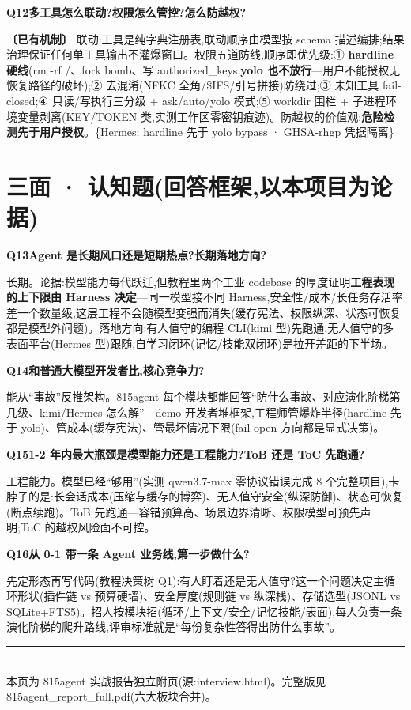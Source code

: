 \documentclass[10pt,a4paper]{article}
\renewcommand{\small}{\fontsize{8}{11.5}\selectfont}
\renewcommand{\footnotesize}{\fontsize{7.5}{10.5}\selectfont}
\newcommand{\taghave}{\textcolor{okc}{\textbf{〔已有机制〕}}}
\newcommand{\tagref}[1]{\textcolor{dimc}{\footnotesize\{#1\}}}
\newcommand{\qhead}[2]{\par\vspace{7pt}\noindent
  \colorbox{acc}{\color{white}\bfseries\small #1}\hspace{4pt}\textbf{#2}\par\vspace{2pt}}
\newenvironment{qa}[2]{\qhead{#1}{#2}\small}{\par\vspace{2pt}}
\begin{document}
\begin{qa}{Q12}{多工具怎么联动?权限怎么管控?怎么防越权?}
\taghave{} 联动:工具是纯字典注册表,联动顺序由模型按 schema 描述编排;结果治理保证任何单工具输出不灌爆窗口。权限五道防线,顺序即优先级:① \textbf{hardline 硬线}(rm -rf /、fork bomb、写 authorized\_keys,\textbf{yolo 也不放行}---用户不能授权无恢复路径的破坏);② 去混淆(NFKC 全角/\$IFS/引号拼接)防绕过;③ 未知工具 fail-closed;④ 只读/写执行三分级 + ask/auto/yolo 模式;⑤ workdir 围栏 + 子进程环境变量剥离(KEY/TOKEN 类,实测工作区零密钥痕迹)。防越权的价值观:\textbf{危险检测先于用户授权}。\tagref{Hermes: hardline 先于 yolo bypass · GHSA-rhgp 凭据隔离}
\end{qa}

\section{三面 · 认知题(回答框架,以本项目为论据)}

\begin{qa}{Q13}{Agent 是长期风口还是短期热点?长期落地方向?}
长期。论据:模型能力每代跃迁,但教程里两个工业 codebase 的厚度证明\textbf{工程表现的上下限由 Harness 决定}---同一模型接不同 Harness,安全性/成本/长任务存活率差一个数量级,这层工程不会随模型变强而消失(缓存宪法、权限纵深、状态可恢复都是模型外问题)。落地方向:有人值守的编程 CLI(kimi 型)先跑通,无人值守的多表面平台(Hermes 型)跟随,自学习闭环(记忆/技能双闭环)是拉开差距的下半场。
\end{qa}

\begin{qa}{Q14}{和普通大模型开发者比,核心竞争力?}
能从``事故''反推架构。815agent 每个模块都能回答``防什么事故、对应演化阶梯第几级、kimi/Hermes 怎么解''---demo 开发者堆框架,工程师管爆炸半径(hardline 先于 yolo)、管成本(缓存宪法)、管最坏情况下限(fail-open 方向都是显式决策)。
\end{qa}

\begin{qa}{Q15}{1-2 年内最大瓶颈是模型能力还是工程能力?ToB 还是 ToC 先跑通?}
工程能力。模型已经``够用''(实测 qwen3.7-max 零协议错误完成 8 个完整项目),卡脖子的是:长会话成本(压缩与缓存的博弈)、无人值守安全(纵深防御)、状态可恢复(断点续跑)。ToB 先跑通---容错预算高、场景边界清晰、权限模型可预先声明;ToC 的越权风险面不可控。
\end{qa}

\begin{qa}{Q16}{从 0-1 带一条 Agent 业务线,第一步做什么?}
先定形态再写代码(教程决策树 Q1):有人盯着还是无人值守?这一个问题决定主循环形状(插件链 vs 预算硬墙)、安全厚度(规则链 vs 纵深栈)、存储选型(JSONL vs SQLite+FTS5)。招人按模块招(循环/上下文/安全/记忆技能/表面),每人负责一条演化阶梯的爬升路线,评审标准就是``每份复杂性答得出防什么事故''。
\end{qa}

\vspace{6pt}
{\footnotesize\color{dimc}\rule{\textwidth}{0.4pt}\\
本页为 815agent 实战报告独立附页(源:interview.html)。完整版见 815agent\_report\_full.pdf(六大板块合并)。}
\end{document}
